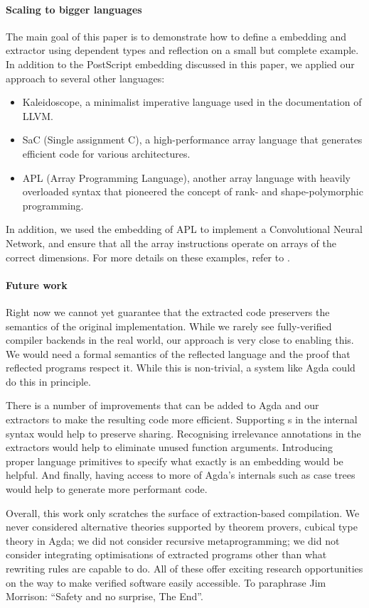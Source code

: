 \documentclass[sigplan,anonymous,review]{acmart}
\newcommand{\AK}[1]{\AgdaKeyword{#1}}
\begin{document}
\paragraph{Scaling to bigger languages}

The main goal of this paper is to demonstrate how to define a
embedding and extractor using dependent types and reflection on a
small but complete example. In addition to the PostScript embedding
discussed in this paper, we applied our approach to several other
languages:
\begin{itemize}
\item Kaleidoscope, a minimalist imperative language used in the
  documentation of LLVM.
\item SaC (Single assignment C), a high-performance array language
  that generates efficient code for various architectures.
\item APL (Array Programming Language), another array language with
  heavily overloaded syntax that pioneered the concept of rank- and
  shape-polymorphic programming.
\end{itemize}
In addition, we used the embedding of APL to implement a Convolutional
Neural Network, and ensure that all the array instructions operate on
arrays of the correct dimensions. For more details on these examples,
refer to \citet{DBLP:journals/corr/abs-2105-10819}.

\paragraph{Future work}

Right now we cannot yet guarantee that the
extracted code preservers the semantics of the original
implementation. While we rarely see
fully-verified compiler backends in the real world,
our approach is very close to enabling this.
We would need a formal semantics of the reflected language
and the proof that reflected programs respect it.
While this is non-trivial, a system like Agda could do
this in principle.

There is a number of improvements that can be added to
Agda and our extractors to make the resulting code more
efficient.  Supporting \AK{let}s in the internal syntax
would help to preserve sharing.  Recognising irrelevance
annotations in the extractors would help to eliminate
unused function arguments.  Introducing proper language
primitives to specify what exactly is an embedding would
be helpful. And finally, having access to more of
Agda's internals such as case trees would help to
generate more performant code.

Overall, this work only scratches the surface of extraction-based
compilation.  We never considered alternative theories supported
by theorem provers, \eg{} cubical type theory in Agda; we did not
consider recursive metaprogramming; we did not consider integrating
optimisations of extracted programs other than what rewriting rules
are capable to do.  All of these offer exciting research opportunities
on the way to make verified software easily accessible.
To paraphrase Jim Morrison: ``Safety and no surprise, The End''.



\end{document}
